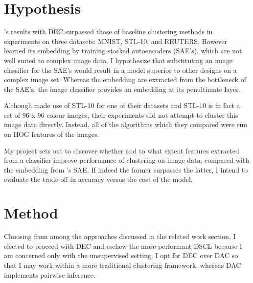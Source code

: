 \section{Hypothesis}

\cite{xie2016unsupervised}'s results with DEC surpassed those of baseline clustering methods in experiments on three datasets: MNIST, STL-10, and REUTERS. However \cite{xie2016unsupervised} learned its embedding by training stacked autoencoders (SAE's), which are not well suited to complex image data. I hypothesize that substituting an image classifier for the SAE's would result in a model superior to other designs on a complex image set. Whereas the embedding are extracted from the bottleneck of the SAE's, the image classifier provides an embedding at its penultimate layer.

Although \cite{xie2016unsupervised} made use of STL-10 for one of their datasets and STL-10 is in fact a set of 96-x-96 colour images, their experiments did not attempt to cluster this image data directly. Instead, all of the algorithms which they compared were run on HOG features of the images.

My project sets out to discover whether and to what extent features extracted from a classifier improve performance of clustering on image data, compared with the embedding from \cite{xie2016unsupervised}'s SAE. If indeed the former surpasses the latter, I intend to evaluate the trade-off in accuracy versus the cost of the model.

\section{Method}

Choosing from among the approaches discussed in the related work section, I elected to proceed with DEC and eschew the more performant DSCL because I am concerned only with the unsupervised setting. I opt for DEC over DAC so that I may work within a more traditional clustering framework, whereas DAC implements pairwise inference.



